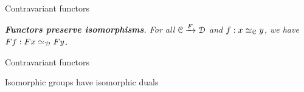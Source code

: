 \begin{frame}[t]{Contravariant functors} %

  \par{} \textit{\textbf{Functors preserve isomorphisms}. For all $\mathcal{C} \xrightarrow{F} \mathcal{D}$ and $f : x \simeq_{\mathcal{C}} y$, we have $F f : F x \simeq_{\mathcal{D}} F y$.}
  \vspace{10\baselineskip}
  \par{}
  
\end{frame}

\begin{frame}[t]{Contravariant functors} %

  \par{} Isomorphic groups have isomorphic duals
  
\end{frame}

